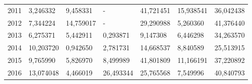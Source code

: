 \begin{table}
\begin{tabular}{p{1cm}p{2cm}p{2cm}p{2cm}p{2cm}p{2cm}p{2cm}}
 2011 &                               3,246332 &        9,458331 &                - &                 41,721451 & 15,938541 &                  36,042438 \\
 2012 &                               7,344224 &       14,759017 &                - &                 29,290988 &  5,260360 &                  41,376440 \\
 2013 &                               6,275371 &        5,442911 &         0,293871 &                  9,147308 &  6,446298 &                  34,263570 \\
 2014 &                              10,203720 &        0,942650 &         2,781731 &                 14,668537 &  8,840589 &                  25,513915 \\
 2015 &                               9,765990 &        5,826970 &         8,499989 &                 41,801809 & 11,166191 &                  37,220892 \\
 2016 &                              13,074048 &        4,466019 &        26,493344 &                 25,765568 &  7,549996 &                  40,840793 \\
\bottomrule
\end{tabular}
\end{table}
